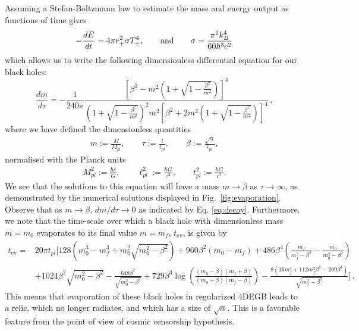\documentclass[reprint,amsmath,amssymbGaps,onecolumn,notitlepage,nofootinbib]{revtex4-1}
\begin{document}
Assuming a Stefan-Boltzmann law to estimate the mass and energy output as functions of time gives
\begin{equation}
-\frac{dE}{dt} = 4\pi r_+^2 \sigma T_+^4, \qquad {\rm and} \qquad \sigma = \frac{\pi^2 k_B^4}{60 \hbar^3 c^2}
\end{equation}
which allows us to write the following dimensionless differential equation for our black holes:
\begin{equation}
\frac{dm}{d\tau} = -\frac{1}{240\pi} \frac{\left[\beta^2 - m^2 \left(1+\sqrt{1-\frac{\beta^2}{m^2}} \right) \right]^4}{\left(1+\sqrt{1-\frac{\beta^2}{m^2}} \right)^2 m^2 \left[\beta^2 +2m^2\left(1+\sqrt{1-\frac{\beta^2}{m^2}} \right) \right]^4}\,,
\label{eq:decay}
\end{equation}
where we have defined the dimensionless quantities
\begin{equation}
\begin{aligned}
    m:=\frac{M}{M_{pl}}, \qquad \tau := \frac{t}{t_{pl}}, \qquad \beta :=\frac{\sqrt{\alpha}}{\ell_{pl}},
\end{aligned}
\label{eq:dimensionless}
\end{equation}
normalised with the Planck units
\begin{equation}
\begin{aligned}
    M_{pl}^2:=\frac{\hbar c}{G}, \qquad \ell_{pl}^2 := \frac{\hbar G}{c^3}, \qquad t_{pl}^2 := \frac{\hbar G}{c^5}.
\end{aligned}
\label{eq:planckunits}
\end{equation}
We see that the solutions to this equation will have a mass $m \to \beta$ as $\tau \to \infty$, as demonstrated by the numerical solutions displayed in Fig.~\ref{fig:evaporation}. Observe that as $m \to \beta$, $dm/d\tau \to 0$ as indicated by Eq. \eqref{eq:decay}. Furthermore, we note that the time-scale over which a black hole with dimensionless mass $m=m_0$ evaporates to its final value $m=m_f$, $t_{\mbox{ev}}$, is given by
\begin{equation}
\begin{aligned}
t_{\mbox{ev}} =& 20 \pi t_{pl}\Bigg[128 \left(m_0^3-m_f^3 + m_0^2 \sqrt{m_0^2 - \beta^2}\right) + 960\beta^2 \left(m_0 -m_f \right)+486\beta^4 \left(\frac{m_f}{m_f^2-\beta^2} - \frac{m_0}{m_0^2-\beta^2}\right)\\
&+1024 \beta^2 \sqrt{m_0^2 - \beta^2} - \frac{648 \beta^2}{\sqrt{m_0^2-\beta^2}}+729 \beta^3 \log \left(\frac{(m_0-\beta)(m_f+\beta)}{(m_0+\beta)(m_f-\beta)} \right)- \frac{8 \left(16 m_f^4+112m_f^2\beta^2-209\beta^4 \right)}{\sqrt{m_f^2-\beta^2}}\Bigg] \, .
\end{aligned}
\label{eq:evtime}
\end{equation}
This means that evaporation of these black holes in regularized 4DEGB leads to a relic, which no longer radiates, and which has a size of $\sqrt{\alpha}$. This is a favorable feature from the point of view of cosmic censorship hypothesis.
\end{document}
